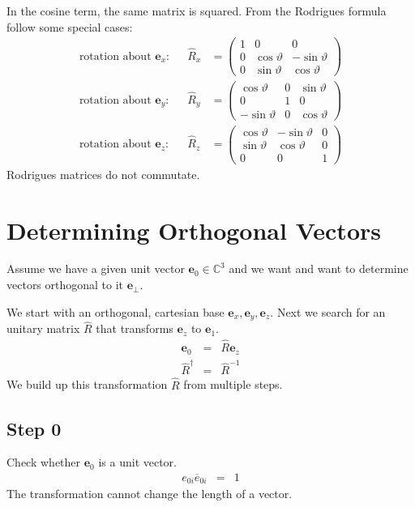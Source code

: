 \documentclass[12pt,a4paper,twoside,openright,BCOR10mm,headsepline,titlepage,abstracton,chapterprefix,final]{scrreprt}
\newcommand\Vector[1]{{\mathbf{#1}}}
\begin{document}
In the cosine term, the same matrix is squared.
From the Rodrigues formula follow some special cases:
\begin{align}
 \text{rotation about $\Vector{e}_x$:} && 
   \hat{R}_x &= 
   \begin{pmatrix}
     1 & 0 & 0 \\
     0 & \cos \vartheta & -\sin \vartheta \\
     0 & \sin \vartheta &  \cos \vartheta
   \end{pmatrix} \label{eq:rodrigues_x}
 \\
 \text{rotation about $\Vector{e}_y$:} && 
   \hat{R}_y &= 
   \begin{pmatrix}
   \cos \vartheta & 0 & \sin \vartheta \\
   0 & 1 & 0 \\
   -\sin \vartheta & 0 & \cos \vartheta
   \end{pmatrix} \label{eq:rodrigues_y}
 \\
 \text{rotation about $\Vector{e}_z$:} && 
   \hat{R}_z &= 
   \begin{pmatrix}
     \cos \vartheta & -\sin \vartheta & 0 \\
     \sin \vartheta & \cos \vartheta & 0 \\
     0 & 0 & 1
   \end{pmatrix} \label{eq:rodrigues_z}
\end{align}
Rodrigues matrices do not commutate.


\section{Determining Orthogonal Vectors}
Assume we have a given unit vector $\Vector{e}_0 \in \mathbb{C}^3$
and we want and want to determine vectors orthogonal to it $\Vector{e}_{\perp}$.

We start with an orthogonal, cartesian base $\Vector{e}_x, \Vector{e}_y, \Vector{e}_z$.
Next we search for an unitary matrix $\hat{R}$ that transforms $\Vector{e}_z$ to $\Vector{e}_1$.
\begin{eqnarray}
 \Vector{e}_0 &=& \hat{R} \Vector{e}_z \\
 \hat{R}^\dagger &=& \hat{R}^{-1}
\end{eqnarray}
We build up this transformation $\hat{R}$ from multiple steps.

\subsection{Step 0}
Check whether $\Vector{e}_0$ is a unit vector.
\begin{eqnarray}
 e_{0i} \overline{e}_{0i} &=& 1
\end{eqnarray}
The transformation cannot change the length of a vector.
\end{document}

